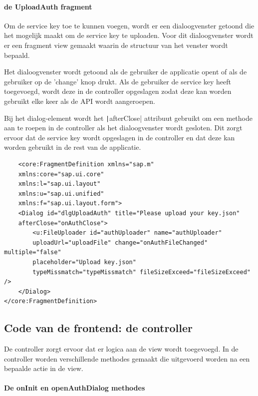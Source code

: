 \paragraph{de UploadAuth fragment}
Om de service key toe te kunnen voegen, wordt er een dialoogvenster getoond die het mogelijk maakt om de service key te uploaden. Voor dit dialoogvenster wordt er een fragment view gemaakt waarin de structuur van het venster wordt bepaald.

Het dialoogvenster wordt getoond als de gebruiker de applicatie opent of als de gebruiker op de 'change' knop drukt. Als de gebruiker de service key heeft toegevoegd, wordt deze in de controller opgeslagen zodat deze kan worden gebruikt elke keer als de API wordt aangeroepen.

Bij het dialog-element wordt het \texttt|afterClose| attribuut gebruikt om een methode aan te roepen in de controller als het dialoogvenster wordt gesloten. Dit zorgt ervoor dat de service key wordt opgeslagen in de controller en dat deze kan worden gebruikt in de rest van de applicatie.

\begin{listing}[H]
\begin{verbatim}
    <core:FragmentDefinition xmlns="sap.m"
    xmlns:core="sap.ui.core"
    xmlns:l="sap.ui.layout"
    xmlns:u="sap.ui.unified"
    xmlns:f="sap.ui.layout.form">
    <Dialog id="dlgUploadAuth" title="Please upload your key.json" 
    afterClose="onAuthClose">
        <u:FileUploader id="authUploader" name="authUploader" 
        uploadUrl="uploadFile" change="onAuthFileChanged" multiple="false" 
        placeholder="Upload key.json" 
        typeMissmatch="typeMissmatch" fileSizeExceed="fileSizeExceed" />
    </Dialog>
</core:FragmentDefinition>
\end{verbatim}
\end{listing}

\subsection{Code van de frontend: de controller}

De controller zorgt ervoor dat er logica aan de view wordt toegevoegd. In de controller worden verschillende methodes gemaakt die uitgevoerd worden na een bepaalde actie in de view. 

\paragraph{De onInit en openAuthDialog methodes}

